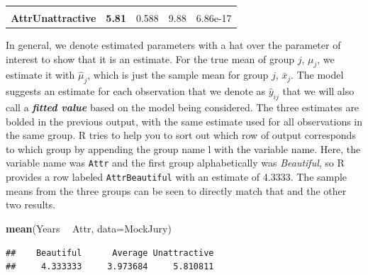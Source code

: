 \documentclass[]{book}
\newenvironment{Shaded}{\begin{snugshade}}{\end{snugshade}}
\newcommand{\KeywordTok}[1]{\textcolor[rgb]{0.13,0.29,0.53}{\textbf{#1}}}
\newcommand{\DataTypeTok}[1]{\textcolor[rgb]{0.13,0.29,0.53}{#1}}
\newcommand{\StringTok}[1]{\textcolor[rgb]{0.31,0.60,0.02}{#1}}
\newcommand{\OperatorTok}[1]{\textcolor[rgb]{0.81,0.36,0.00}{\textbf{#1}}}
\newcommand{\NormalTok}[1]{#1}
\theoremstyle{definition}
\theoremstyle{definition}
\theoremstyle{remark}
\begin{document}
\begin{longtable}[]{@{}ccccc@{}}
\begin{minipage}[t]{0.12\columnwidth}
\end{minipage}\tabularnewline
\begin{minipage}[t]{0.27\columnwidth}\centering\strut
\textbf{AttrUnattractive}\strut
\end{minipage} & \begin{minipage}[t]{0.13\columnwidth}\centering\strut
\textbf{5.81}\strut
\end{minipage} & \begin{minipage}[t]{0.16\columnwidth}\centering\strut
0.588\strut
\end{minipage} & \begin{minipage}[t]{0.12\columnwidth}\centering\strut
9.88\strut
\end{minipage} & \begin{minipage}[t]{0.12\columnwidth}\centering\strut
6.86e-17\strut
\end{minipage}\tabularnewline
\bottomrule
\end{longtable}

In general, we denote estimated parameters with a hat over the parameter
of interest to show that it is an estimate. For the true mean of group
\(j\), \(\mu_j\), we estimate it with \(\hat{\mu}_j\), which is just the
sample mean for group \(j\), \(\bar{x}_j\). The model suggests an
estimate for each observation that we denote as \(\hat{y}_{ij}\) that we
will also call a \textbf{\emph{fitted value}} based on the model being
considered. The three estimates are bolded in the previous output, with
the same estimate used for all observations in the same group. R tries
to help you to sort out which row of output corresponds to which group
by appending the group name l with the variable name. Here, the variable
name was \texttt{Attr} and the first group alphabetically was
\emph{Beautiful}, so R provides a row labeled \texttt{AttrBeautiful}
with an estimate of 4.3333. The sample means from the three groups can
be seen to directly match that and the other two results.

\begin{Shaded}
\begin{Highlighting}[]
\KeywordTok{mean}\NormalTok{(Years }\OperatorTok{~}\StringTok{ }\NormalTok{Attr, }\DataTypeTok{data=}\NormalTok{MockJury)}
\end{Highlighting}
\end{Shaded}

\begin{verbatim}
##    Beautiful      Average Unattractive 
##     4.333333     3.973684     5.810811
\end{verbatim}
\end{document}

